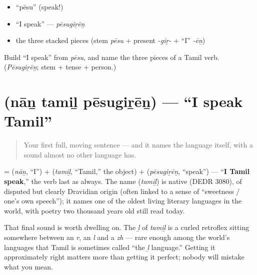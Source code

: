 \begin{itemize}
\raggedright
  \item \textquotedblleft{}pēsu\textquotedblright{} (speak!)
  \item \textquotedblleft{}I speak\textquotedblright{} — \emph{pēsugiṟēṉ}
  \item the three stacked pieces (stem \emph{pēsu} + present \emph{-giṟ-} + \textquotedblleft{}I\textquotedblright{} \emph{-ēṉ})
\end{itemize}

\begin{tcolorbox}[breakable,colback=teal!4,colframe=teal!35!black,title={Before you move on}]
Build \textquotedblleft{}I speak\textquotedblright{} from \emph{pēsu}, and name the three pieces of a Tamil verb. (\emph{Pēsugiṟēṉ}; stem + tense + person.)
\end{tcolorbox}
\section[\texorpdfstring{\ta{நான்} \ta{தமிழ்} \ta{பேசுகிறேன்} (nāṉ tamiḻ pēsugiṟēṉ)}{நான் தமிழ் பேசுகிறேன் (nāṉ tamiḻ pēsugiṟēṉ)}]{   (nāṉ tamiḻ pēsugiṟēṉ) — \textquotedblleft{}I speak Tamil\textquotedblright{}}

\label{lesson:TA-C05-naan-tamizh-pesugiren}



\begin{quote}
Your first full, moving sentence — and it names the language itself, with a sound almost no other language has.
\end{quote}

\begin{cousinweb}
\textbf{  } = \textbf{} (\emph{nāṉ}, \textquotedblleft{}I\textquotedblright{}) + \textbf{} (\emph{tamiḻ}, \textquotedblleft{}Tamil,\textquotedblright{} the object) + \textbf{} (\emph{pēsugiṟēṉ}, \textquotedblleft{}speak\textquotedblright{}) — \textquotedblleft{}\textbf{I Tamil speak},\textquotedblright{} the verb last as always. The name \textbf{} (\emph{tamiḻ}) is native (DEDR 3080), of disputed but clearly Dravidian origin (often linked to a sense of \textquotedblleft{}sweetness / one's own speech\textquotedblright{}); it names one of the oldest living literary languages in the world, with poetry two thousand years old still read today.

That final sound is worth dwelling on. The \emph{ḻ} of \emph{tamiḻ} is a curled retroflex sitting somewhere between an \emph{r}, an \emph{l} and a \emph{zh} — rare enough among the world's languages that Tamil is sometimes called \textquotedblleft{}the \emph{ḻ} language.\textquotedblright{} Getting it approximately right matters more than getting it perfect; nobody will mistake what you mean.
\end{cousinweb}

